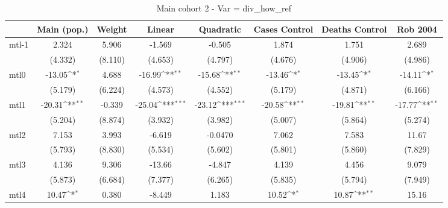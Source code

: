 \documentclass{article}
\begin{document}
{
\def\sym#1{\ifmmode^{#1}\else\(^{#1}\)\fi}
\begin{longtable}{l*{7}{c}}
\caption{Main cohort 2 - Var = div\_how\_ref}\\
\hline\hline\endfirsthead\hline\endhead\hline\endfoot\endlastfoot
                &\multicolumn{1}{c}{Main (pop.)}&\multicolumn{1}{c}{Weight}&\multicolumn{1}{c}{Linear}&\multicolumn{1}{c}{Quadratic}&\multicolumn{1}{c}{Cases Control}&\multicolumn{1}{c}{Deaths Control}&\multicolumn{1}{c}{Rob 2004}\\
\hline
mtl-1           &    2.324         &    5.906         &   -1.569         &   -0.505         &    1.874         &    1.751         &    2.689         \\
                &  (4.332)         &  (8.110)         &  (4.653)         &  (4.797)         &  (4.676)         &  (4.906)         &  (4.986)         \\
mtl0            &   -13.05\sym{*}  &    4.688         &   -16.99\sym{**} &   -15.68\sym{**} &   -13.46\sym{*}  &   -13.45\sym{*}  &   -14.11\sym{*}  \\
                &  (5.179)         &  (6.224)         &  (4.573)         &  (4.552)         &  (5.179)         &  (4.871)         &  (6.166)         \\
mtl1            &   -20.31\sym{**} &   -0.339         &   -25.04\sym{***}&   -23.12\sym{***}&   -20.58\sym{**} &   -19.81\sym{**} &   -17.77\sym{**} \\
                &  (5.204)         &  (8.874)         &  (3.932)         &  (3.982)         &  (5.007)         &  (5.864)         &  (5.274)         \\
mtl2            &    7.153         &    3.993         &   -6.619         &  -0.0470         &    7.062         &    7.583         &    11.67         \\
                &  (5.793)         &  (8.830)         &  (5.534)         &  (5.602)         &  (5.801)         &  (5.860)         &  (7.829)         \\
mtl3            &    4.136         &    9.306         &   -13.66         &   -4.847         &    4.139         &    4.456         &    9.079         \\
                &  (5.873)         &  (6.684)         &  (7.377)         &  (6.265)         &  (5.835)         &  (5.794)         &  (7.949)         \\
mtl4            &    10.47\sym{*}  &    0.380         &   -8.449         &    1.183         &    10.52\sym{*}  &    10.87\sym{**} &    15.16         \\

\end{longtable}}
\end{document}
